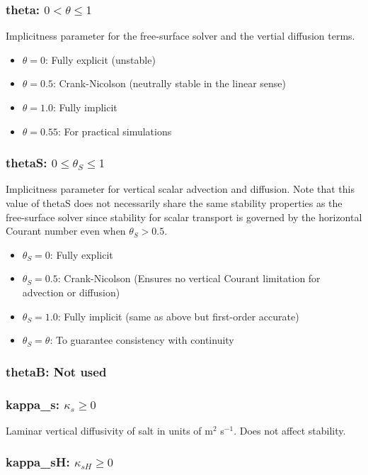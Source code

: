 \subsubsection{theta: $0<\theta\le 1$}

Implicitness parameter for the free-surface solver and the vertial diffusion terms.
\begin{itemize}
\item $\theta=0$: Fully explicit (unstable)
\item $\theta=0.5$: Crank-Nicolson (neutrally stable in the linear sense)
\item $\theta=1.0$: Fully implicit
\item $\theta=0.55$: For practical simulations
\end{itemize}

\subsubsection{thetaS: $0\le \theta_S \le 1$}

Implicitness parameter for vertical scalar advection and diffusion.  Note that this
value of thetaS does not necessarily share the same stability properties as the
free-surface solver since stability for scalar transport is governed by
the horizontal Courant number even when $\theta_S>0.5$.
\begin{itemize}
\item $\theta_S=0$: Fully explicit 
\item $\theta_S=0.5$: Crank-Nicolson (Ensures no vertical Courant limitation for advection or diffusion)
\item $\theta_S=1.0$: Fully implicit (same as above but first-order accurate)
\item $\theta_S=\theta$: To guarantee consistency with continuity 
\end{itemize}

\subsubsection{thetaB: Not used}

\subsubsection{kappa\_s: $\kappa_s\ge 0$}

Laminar vertical diffusivity of salt in units of m$^2$ s$^{-1}$.  Does not affect stability.

\subsubsection{kappa\_sH: $\kappa_{sH}\ge 0$}

